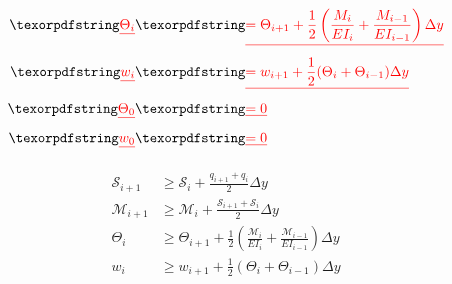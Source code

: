 \DIFdelbegin \begin{eqnarray*}
    \DIFdel{\label{e:angle}
    \Theta_{i} }&\DIFdel{= \Theta_{i+1} + \frac{1}{2} \left(\frac{M_i}{EI_i} + \frac{M_{i-1}}{EI_{i-1}} \right) \Delta y }\\
    \DIFdel{\label{e:deflection}
    w_{i} }&\DIFdel{= w_{i+1} + \frac{1}{2} (\Theta_i + \Theta_{i-1}) \Delta y }\\
    \DIFdel{\label{e:angleboundary}
    \Theta_0 }&\DIFdel{= 0 }\\
    \DIFdel{\label{e:defboundary}
    w_0 }&\DIFdel{= 0 
}\end{eqnarray*}
\DIFdelend %

\DIFdelbegin {}%
\DIFdel{-}%

\DIFdelend \begin{align}
    \label{e:sheargp}
    \mathcal{S}_{i+1} &\geq \mathcal{S}_i + \frac{q_{i+1} + q_i}{2} \Delta y \\
    \label{e:momentgp}
    \mathcal{M}_{i+1} &\geq \mathcal{M}_i + \frac{\mathcal{S}_{i+1} + \mathcal{S}_i}{2} \Delta y \\
    \label{e:anglegp}
    \Theta_{i} &\geq \Theta_{i+1} + \frac{1}{2} \left(\frac{\mathcal{M}_i}{EI_i} + \frac{\mathcal{M}_{i-1}}{EI_{i-1}} \right) \Delta y \\
    \label{e:deflection}
    w_{i} &\geq w_{i+1} + \frac{1}{2} (\Theta_i + \Theta_{i-1}) \Delta y 
\end{align}

